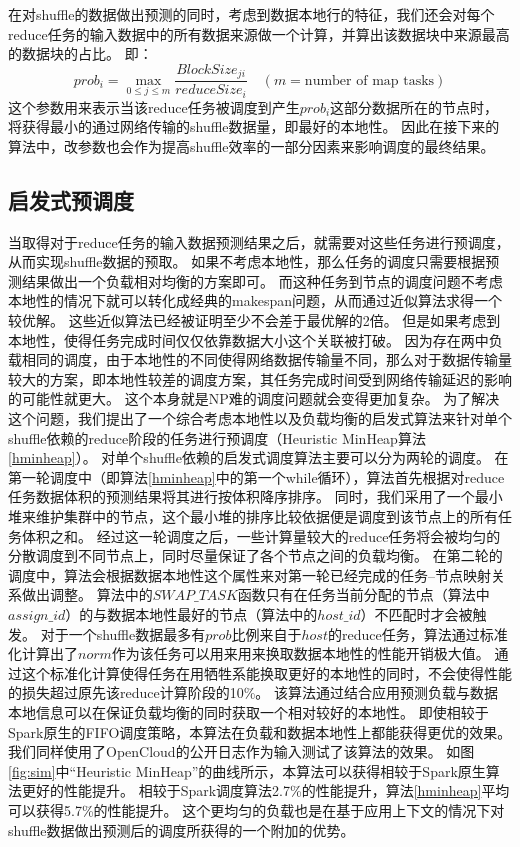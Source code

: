 在对shuffle的数据做出预测的同时，考虑到数据本地行的特征，我们还会对每个reduce任务的输入数据中的所有数据来源做一个计算，并算出该数据块中来源最高的数据块的占比。
即：
\begin{equation}
	\label{eq:prob}
	prob_i = \max_{0 \leq j \leq m} \frac{BlockSize_{ji}}{reduceSize_i} \quad (m = \text{number of map tasks})
\end{equation}
这个参数用来表示当该reduce任务被调度到产生$prob_i$这部分数据所在的节点时，将获得最小的通过网络传输的shuffle数据量，即最好的本地性。
因此在接下来的算法中，改参数也会作为提高shuffle效率的一部分因素来影响调度的最终结果。

\subsection{启发式预调度}
\label{subsec:schedule}

当取得对于reduce任务的输入数据预测结果之后，就需要对这些任务进行预调度，从而实现shuffle数据的预取。
如果不考虑本地性，那么任务的调度只需要根据预测结果做出一个负载相对均衡的方案即可。
而这种任务到节点的调度问题不考虑本地性的情况下就可以转化成经典的makespan问题，从而通过近似算法求得一个较优解\cite{approximation}。
这些近似算法已经被证明至少不会差于最优解的2倍。
但是如果考虑到本地性，使得任务完成时间仅仅依靠数据大小这个关联被打破。
因为存在两中负载相同的调度，由于本地性的不同使得网络数据传输量不同，那么对于数据传输量较大的方案，即本地性较差的调度方案，其任务完成时间受到网络传输延迟的影响的可能性就更大。
这个本身就是NP难的调度问题就会变得更加复杂。
为了解决这个问题，我们提出了一个综合考虑本地性以及负载均衡的启发式算法来针对单个shuffle依赖的reduce阶段的任务进行预调度（Heuristic MinHeap算法\ref{hminheap}）。
对单个shuffle依赖的启发式调度算法主要可以分为两轮的调度。
在第一轮调度中（即算法\ref{hminheap}中的第一个while循环），算法首先根据对reduce任务数据体积的预测结果将其进行按体积降序排序。
同时，我们采用了一个最小堆来维护集群中的节点，这个最小堆的排序比较依据便是调度到该节点上的所有任务体积之和。
经过这一轮调度之后，一些计算量较大的reduce任务将会被均匀的分散调度到不同节点上，同时尽量保证了各个节点之间的负载均衡。
在第二轮的调度中，算法会根据数据本地性这个属性来对第一轮已经完成的任务--节点映射关系做出调整。
算法中的$SWAP\_TASK$函数只有在任务当前分配的节点（算法中$assign\_id$）的与数据本地性最好的节点（算法中的$host\_id$）不匹配时才会被触发。
对于一个shuffle数据最多有$prob$比例来自于$host$的reduce任务，算法通过标准化计算出了$norm$作为该任务可以用来用来换取数据本地性的性能开销极大值。
通过这个标准化计算使得任务在用牺牲系能换取更好的本地性的同时，不会使得性能的损失超过原先该reduce计算阶段的10\%。
该算法通过结合应用预测负载与数据本地信息可以在保证负载均衡的同时获取一个相对较好的本地性。
即使相较于Spark原生的FIFO调度策略\cite{sparksource}，本算法在负载和数据本地性上都能获得更优的效果。
我们同样使用了OpenCloud的公开日志作为输入测试了该算法的效果。
如图\ref{fig:sim}中“Heuristic MinHeap”的曲线所示，本算法可以获得相较于Spark原生算法更好的性能提升。
相较于Spark调度算法2.7\%的性能提升，算法\ref{hminheap}平均可以获得5.7\%的性能提升。
这个更均匀的负载也是在基于应用上下文的情况下对shuffle数据做出预测后的调度所获得的一个附加的优势。

